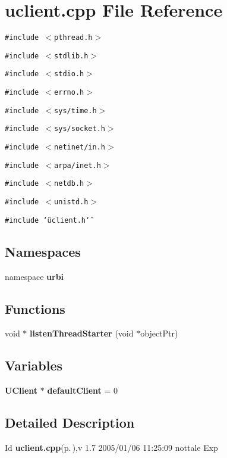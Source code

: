 \section{uclient.cpp File Reference}
\label{uclient_8cpp}
{\tt \#include $<$pthread.h$>$}\par
{\tt \#include $<$stdlib.h$>$}\par
{\tt \#include $<$stdio.h$>$}\par
{\tt \#include $<$errno.h$>$}\par
{\tt \#include $<$sys/time.h$>$}\par
{\tt \#include $<$sys/socket.h$>$}\par
{\tt \#include $<$netinet/in.h$>$}\par
{\tt \#include $<$arpa/inet.h$>$}\par
{\tt \#include $<$netdb.h$>$}\par
{\tt \#include $<$unistd.h$>$}\par
{\tt \#include \char`\"{}uclient.h\char`\"{}}\par
\subsection*{Namespaces}
\begin{CompactItemize}
\item 
namespace {\bf urbi}
\end{CompactItemize}
\subsection*{Functions}
\begin{CompactItemize}
\item 
void $\ast$ {\bf listen\-Thread\-Starter} (void $\ast$object\-Ptr)\label{uclient_8cpp_a1}

\end{CompactItemize}
\subsection*{Variables}
\begin{CompactItemize}
\item 
{\bf UClient} $\ast$ {\bf default\-Client} = 0\label{namespaceurbi_a4}

\end{CompactItemize}


\subsection{Detailed Description}
\begin{Desc}
\item[Id]{\bf uclient.cpp}{\rm (p.\,\pageref{uclient_8cpp})},v 1.7 2005/01/06 11:25:09 nottale Exp \end{Desc}


